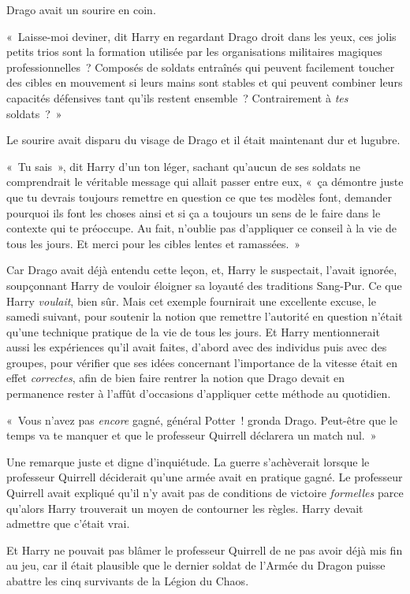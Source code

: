 Drago avait un sourire en coin.

«~Laisse-moi deviner, dit Harry en regardant Drago droit dans les yeux, ces jolis petits trios sont la formation utilisée par les organisations militaires magiques professionnelles~? Composés de soldats entraînés qui peuvent facilement toucher des cibles en mouvement si leurs mains sont stables et qui peuvent combiner leurs capacités défensives tant qu'ils restent ensemble~? Contrairement à \emph{tes} soldats~?~»

Le sourire avait disparu du visage de Drago et il était maintenant dur et lugubre.

«~Tu sais~», dit Harry d'un ton léger, sachant qu'aucun de ses soldats ne comprendrait le véritable message qui allait passer entre eux, «~ça démontre juste que tu devrais toujours remettre en question ce que tes modèles font, demander pourquoi ils font les choses ainsi et si ça a toujours un sens de le faire dans le contexte qui te préoccupe. Au fait, n'oublie pas d'appliquer ce conseil à la vie de tous les jours. Et merci pour les cibles lentes et ramassées.~»

Car Drago avait déjà entendu cette leçon, et, Harry le suspectait, l'avait ignorée, soupçonnant Harry de vouloir éloigner sa loyauté des traditions Sang-Pur. Ce que Harry \emph{voulait}, bien sûr. Mais cet exemple fournirait une excellente excuse, le samedi suivant, pour soutenir la notion que remettre l'autorité en question n'était qu'une technique pratique de la vie de tous les jours. Et Harry mentionnerait aussi les expériences qu'il avait faites, d'abord avec des individus puis avec des groupes, pour vérifier que ses idées concernant l'importance de la vitesse était en effet \emph{correctes}, afin de bien faire rentrer la notion que Drago devait en permanence rester à l'affût d'occasions d'appliquer cette méthode au quotidien.

«~Vous n'avez pas \emph{encore} gagné, général Potter~! gronda Drago. Peut-être que le temps va te manquer et que le professeur Quirrell déclarera un match nul.~»

Une remarque juste et digne d'inquiétude. La guerre s'achèverait lorsque le professeur Quirrell déciderait qu'une armée avait en pratique gagné. Le professeur Quirrell avait expliqué qu'il n'y avait pas de conditions de victoire \emph{formelles} parce qu'alors Harry trouverait un moyen de contourner les règles. Harry devait admettre que c'était vrai.

Et Harry ne pouvait pas blâmer le professeur Quirrell de ne pas avoir déjà mis fin au jeu, car il était plausible que le dernier soldat de l'Armée du Dragon puisse abattre les cinq survivants de la Légion du Chaos.

